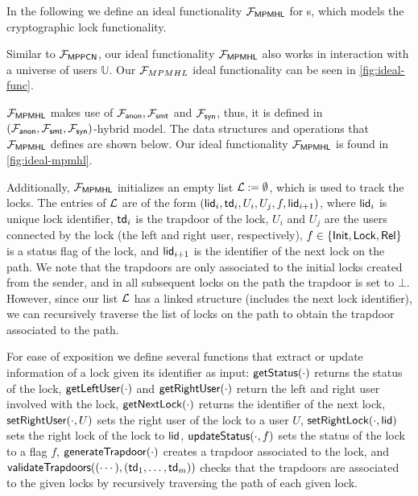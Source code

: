 In the following we define an ideal functionality $\mathcal{F}_{\mathsf{MPMHL}}$ for {\sysname}s, which 
models the cryptographic lock functionality.

Similar to $\mathcal{F}_{\mathsf{MPPCN}}$, our ideal functionality $\mathcal{F}_{\mathsf{MPMHL}}$ also works 
in interaction with a universe of users $\mathbb{U}$.  Our $\mathcal{F}_{MPMHL}$ 
ideal functionality can be seen in \cref{fig:ideal-func}.

$\mathcal{F}_{\mathsf{MPMHL}}$ makes use of $\mathcal{F}_{\mathsf{anon}}, \mathcal{F}_{\mathsf{smt}}$ and $\mathcal{F}_{\mathsf{syn}}$, thus, it is 
defined in $(\mathcal{F}_{\mathsf{anon}}, \mathcal{F}_{\mathsf{smt}}, \mathcal{F}_{\mathsf{syn}})$-hybrid model. The data structures and 
operations that $\mathcal{F}_{\mathsf{MPMHL}}$ defines are shown below. Our ideal functionality 
$\mathcal{F}_{\mathsf{MPMHL}}$ is found in \cref{fig:ideal-mpmhl}.


 Additionally, 
$\mathcal{F}_{\mathsf{MPMHL}}$ initializes an empty list $\mathcal{L} := \emptyset$, which is used to track the 
locks. The entries of $\mathcal{L}$ are of the form $(\mathsf{lid}_i, \mathsf{td}_i, U_i, U_j, f, \\ \mathsf{lid}_{i+1})$, 
where $\mathsf{lid}_i$ is unique lock identifier, $\mathsf{td}_i$ is the trapdoor of the lock, $U_i$ and $U_j$ 
are the users connected by the lock (the left and right user, respectively), $f \in \{\mathsf{Init},\mathsf{Lock},
\mathsf{Rel}\}$ is a status flag of the lock, and $\mathsf{lid}_{i+1}$ is the identifier of the next lock on the 
path. We note that the trapdoors are only associated to the initial locks created from the sender, 
and in all subsequent locks on the path the trapdoor is set to $\bot$. However, since our list 
$\mathcal{L}$ has a linked structure (includes the next lock identifier), we can recursively traverse the 
list of locks on the path to obtain the trapdoor associated to the path.

For ease of exposition we define several functions that extract or update information of a 
lock given its identifier as input: $\mathsf{getStatus}(\cdot)$ returns the status of the lock, 
$\mathsf{getLeftUser}(\cdot)$ and $\mathsf{getRightUser}(\cdot)$ return the left and right user involved with the 
lock, $\mathsf{getNextLock}(\cdot)$ returns the identifier of the next lock, $\mathsf{setRightUser}(\cdot, U)$ 
sets the right user of the lock to a user $U$, $\mathsf{setRightLock}(\cdot, \mathsf{lid})$ sets the right lock 
of the lock to $\mathsf{lid}$, $\mathsf{updateStatus}(\cdot, f)$ sets the status of the lock to a flag $f$, 
$\mathsf{generateTrapdoor}(\cdot)$ creates a trapdoor associated to the lock, and $\mathsf{validateTrapdoors}
((\cdots), (\mathsf{td}_1,\ldots,\mathsf{td}_m))$ checks that the trapdoors are associated to the given locks 
by recursively traversing the path of each given lock.

